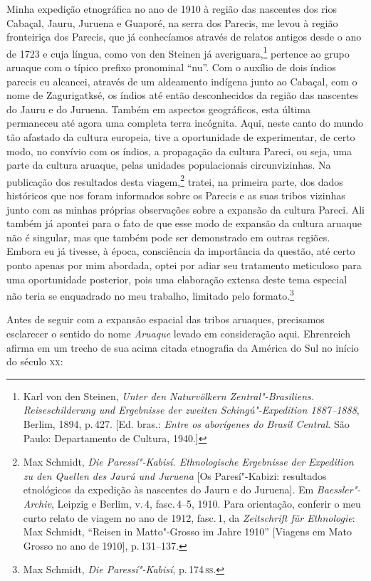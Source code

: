 Minha expedição etnográfica no ano de 1910 à região das nascentes dos
rios Cabaçal, Jauru, Juruena e Guaporé, na serra dos Parecis, me levou à
região fronteiriça dos Parecis, que já conhecíamos através de relatos
antigos desde o ano de 1723 e cuja língua, como von den Steinen já
averiguara,\footnote{Karl von den Steinen, \textit{Unter den Naturvölkern
  Zentral"-Brasiliens. Reiseschilderung und Ergebnisse der zweiten
  Schingú"-Expedition 1887--1888}, Berlim, 1894, p.\,427. {[}Ed. bras.: \textit{Entre os aborígenes do Brasil Central}. São Paulo: Departamento de Cultura, 1940.{]}} pertence ao grupo aruaque com o
típico prefixo pronominal ``nu''. Com o auxílio de dois índios parecis
eu alcancei, através de um aldeamento indígena junto ao Cabaçal, com o
nome de Zagurigatksé, os índios até então desconhecidos da região das
nascentes do Jauru e do Juruena. Também em aspectos geográficos, esta
última permaneceu até agora uma completa terra incógnita. Aqui, neste
canto do mundo tão afastado da cultura europeia, tive a oportunidade de
experimentar, de certo modo, no convívio com os índios, a propagação da
cultura Pareci, ou seja, uma parte da cultura aruaque, pelas unidades
populacionais circunvizinhas. Na publicação dos resultados desta
viagem,\footnote{Max Schmidt, \textit{Die Paressí"-Kabisí. Ethnologische
  Ergebnisse der Expedition zu den Quellen des Jaurú und Juruena} {[}Os Paresí"-Kabizi: resultados etnológicos da expedição às nascentes do Jauru e do Juruena{]}. Em \textit{Baessler"-Archiv}, Leipzig e Berlim, v.\,4, fasc.\,4--5, 1910. Para orientação, conferir o meu curto
  relato de viagem no ano de 1912, fasc.\,1, da \textit{Zeitschrift für
  Ethnologie}: Max Schmidt, ``Reisen in Matto"-Grosso im Jahre 1910'' {[}Viagens em Mato Grosso no ano de 1910{]}, p.\,131--137.} tratei, na
primeira parte, dos dados históricos que nos foram informados sobre os
Parecis e as suas tribos vizinhas junto com as minhas próprias
observações sobre a expansão da cultura Pareci. Ali também já apontei
para o fato de que esse modo de expansão da cultura aruaque não é singular, mas que
também pode ser demonstrado em outras regiões. Embora eu já tivesse,
à época, consciência da importância da questão, até certo ponto apenas
por mim abordada, optei por adiar seu
tratamento meticuloso para uma oportunidade posterior, pois uma
elaboração extensa deste tema especial não teria se enquadrado no meu
trabalho, limitado pelo formato.\footnote{Max Schmidt, \textit{Die
  Paressí"-Kabisí}, p.\,174\,\textsc{ss}.}

Antes de seguir com a expansão espacial das tribos aruaques, precisamos
esclarecer o sentido do nome \textit{Aruaque} levado em consideração aqui.
Ehrenreich afirma em um trecho de sua acima citada etnografia da América
do Sul no início do século \textsc{xx}: 


